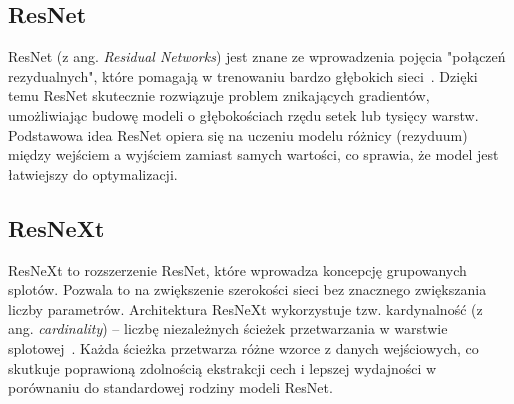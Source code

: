\subsection{ResNet}

ResNet (z ang. \textit{Residual Networks}) jest znane ze wprowadzenia pojęcia "połączeń rezydualnych", które pomagają w trenowaniu bardzo głębokich sieci~\cite{resnet}.
Dzięki temu ResNet skutecznie rozwiązuje problem znikających gradientów, umożliwiając budowę modeli o głębokościach rzędu setek lub tysięcy warstw.
Podstawowa idea ResNet opiera się na uczeniu modelu różnicy (rezyduum) między wejściem a wyjściem zamiast samych wartości, co sprawia, że model jest łatwiejszy do optymalizacji.

\subsection{ResNeXt}

ResNeXt to rozszerzenie ResNet, które wprowadza koncepcję grupowanych splotów.
Pozwala to na zwiększenie szerokości sieci bez znacznego zwiększania liczby parametrów.
Architektura ResNeXt wykorzystuje tzw.
kardynalność (z ang. \textit{cardinality}) – liczbę niezależnych ścieżek przetwarzania w warstwie splotowej~\cite{cardinality}.
Każda ścieżka przetwarza różne wzorce z danych wejściowych, co skutkuje poprawioną zdolnością ekstrakcji cech i lepszej wydajności w porównaniu do standardowej rodziny modeli ResNet.